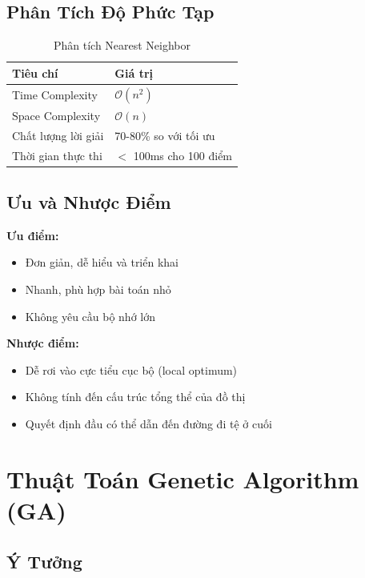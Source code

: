 \documentclass[12pt,a4paper,openany,oneside]{report}
\newcommand{\bigO}{\mathcal{O}}
\begin{document}
\subsection{Phân Tích Độ Phức Tạp}

\begin{table}[h]
\centering
\caption{Phân tích Nearest Neighbor}
\begin{tabular}{@{}ll@{}}
\toprule
\textbf{Tiêu chí} & \textbf{Giá trị} \\
\midrule
Time Complexity & $\bigO(n^2)$ \\
Space Complexity & $\bigO(n)$ \\
Chất lượng lời giải & 70-80\% so với tối ưu \\
Thời gian thực thi & $<$ 100ms cho 100 điểm \\
\bottomrule
\end{tabular}
\end{table}

\subsection{Ưu và Nhược Điểm}

\textbf{Ưu điểm:}
\begin{itemize}
    \item Đơn giản, dễ hiểu và triển khai
    \item Nhanh, phù hợp bài toán nhỏ
    \item Không yêu cầu bộ nhớ lớn
\end{itemize}

\textbf{Nhược điểm:}
\begin{itemize}
    \item Dễ rơi vào cực tiểu cục bộ (local optimum)
    \item Không tính đến cấu trúc tổng thể của đồ thị
    \item Quyết định đầu có thể dẫn đến đường đi tệ ở cuối
\end{itemize}

\section{Thuật Toán Genetic Algorithm (GA)}

\subsection{Ý Tưởng}
\end{document}
